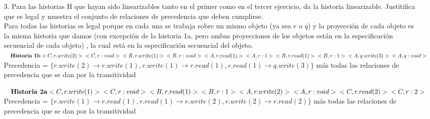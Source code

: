 \documentclass[12pt, letterpaper]{article}
\begin{document}
\begin{itemize}

\item[3. ] Para las historias H que hayan sido linearizables tanto en el primer como en el tercer ejercicio, da la historia linearizable. Justitifica que es legal y muestra el conjunto de relaciones de precedencia que deben cumplirse.\\
Para todas las historias es legal porque en cada una se trabaja sobre un mismo objeto (ya sea $r$ o $q$) y la proyección de cada objeto es la misma historia que damos (con excepción de la historia 1a, pero ambas proyecciones de los objetos están en la especificación secuencial de cada objeto) , la cual está en la especificación secuencial del objeto.\\
$\textbf{Historia 1b}\\
<C, r.write(2)>\\
<C, r:void>\\
<B, r.write(1)>\\
<B, r:void>\\
<A, r.read(1)>\\
<A, r:1>\\
<B, r.read(1)>\\
<B, r:1>\\
<A, q.write(3)>\\
<A, q:void>
$\\
Precedencia = $\{r.write(2) \rightarrow r.write(1), r.write(1) \rightarrow r.read(1), r.read(1) \rightarrow q.write(3)\}$ más todas las relaciones de precedencia que se dan por la transitividad

$\textbf{Historia 2a}\\
<C, r.write(1)>\\
<C, r:void>\\
<B, r.read(1)>\\
<B, r:1>\\
<A, r.write(2)>\\
<A, r:void>\\
<C, r.read(2)>\\
<C, r:2>\\
$\\
Precedencia = $\{r.write(1) \rightarrow r.read(1), r.read(1) \rightarrow r.write(2), r.write(2) \rightarrow r.read(2)\}$ más todas las relaciones de precedencia que se dan por la transitividad


\end{itemize}
\end{document}
